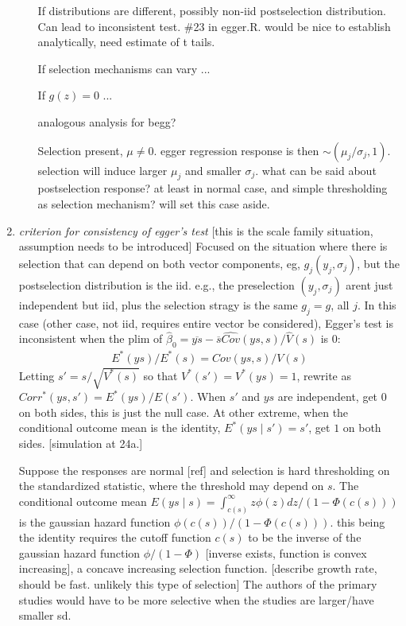 \documentclass{article}
\newcommand{\E}{E}
\newcommand{\V}{V}
\newcommand{\Cov}{Cov}
\newcommand{\Corr}{Corr}
\newcommand{\mean}[1]{\overline{#1}}
\newcommand{\sel}[1]{#1^*}
\begin{document}
\begin{enumerate}
\begin{enumerate}
  If distributions are different, possibly non-iid postselection
  distribution. Can lead to inconsistent test. \#23 in egger.R. would be
  nice to establish analytically, need estimate of t tails.

  If selection mechanisms can vary ...

  If $g(z)=0$ ...

  analogous analysis for begg?
  
  Selection present, $\mu\neq 0$. egger regression response is then
  $\sim (\mu_j/\sigma_j,1)$. selection will induce larger $\mu_j$ and
  smaller $\sigma_j$. what can be said about postselection response?
  at least in normal case, and simple thresholding as selection
  mechanism? will set this case aside.
\end{enumerate}



\item\emph{criterion for consistency of egger's test} [this is the
  scale family situation, assumption needs to be introduced] Focused
  on the situation where there is selection that can depend on both
  vector components, eg, $g_j(y_j,\sigma_j)$, but the postselection
  distribution is the iid. e.g., the preselection $(y_j,\sigma_j)$
  arent just independent but iid, plus the selection stragy is the
  same $g_j=g$, all $j$.  In this case (other case, not iid, requires
  entire vector be considered), Egger's test is inconsistent when the
  plim of
  $\hat{\beta}_0=\mean{ys}-\mean{s}\hat{\Cov}(ys,s)/\hat{\V}(s)$ is
  $0$:
  \begin{align}
    \sel\E(ys)/\sel\E(s) = \Cov(ys,s)/\V(s)
  \end{align}
  Letting $s'=s/\sqrt{\sel\V(s)}$ so that $\sel\V(s')=\sel\V(ys)=1$, rewrite as
  $\sel\Corr(ys,s')=\sel\E(ys)/E(s')$.  When $s'$ and $ys$ are independent, get
  $0$ on both sides, this is just the null case. At other extreme,
  when the conditional outcome mean is the identity, $\sel\E(ys\mid s')=s'$, get $1$ on
  both sides. [simulation at 24a.]

  Suppose the responses are normal [ref] and selection is hard
  thresholding on the standardized statistic, where the threshold may
  depend on $s$.  The conditional outcome mean
  $E(ys\mid s)=\int_{c(s)}^\infty z\phi(z)dz/(1-\Phi(c(s)))$ is the
  gaussian hazard function $\phi(c(s))/(1-\Phi(c(s)))$. this being the
  identity requires the cutoff function $c(s)$ to be the inverse of
  the gaussian hazard function $\phi/(1-\Phi)$ [inverse exists,
  function is convex increasing], a concave increasing selection
  function. [describe growth rate, should be fast. unlikely this type
  of selection] The authors of the primary studies would have to be
  more selective when the studies are larger/have smaller sd.


\end{enumerate}
\end{document}
